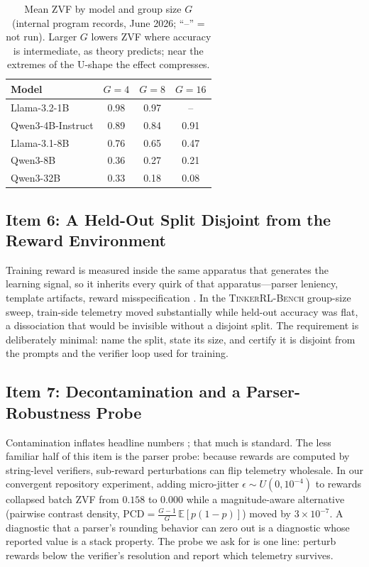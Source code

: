 \documentclass{article}  \usepackage[preprint,nonatbib]{neurips_2026} \usepackage[numbers]{natbib}
\newcommand{\ours}{\textsc{TinkerRL-Bench}}
\newcommand{\E}{\mathbb{E}}
\begin{document}
\begin{table}[t]
\centering
\caption{Mean ZVF by model and group size $G$ (internal program records,
June 2026; ``--'' = not run). Larger $G$ lowers ZVF where accuracy is
intermediate, as theory predicts; near the extremes of the U-shape the effect
compresses.}
\label{tab:p5-gsize}
\small
\begin{tabular}{@{}lccc@{}}
\toprule
Model & $G=4$ & $G=8$ & $G=16$ \\
\midrule
Llama-3.2-1B      & 0.98 & 0.97 & --   \\
Qwen3-4B-Instruct & 0.89 & 0.84 & 0.91 \\
Llama-3.1-8B      & 0.76 & 0.65 & 0.47 \\
Qwen3-8B          & 0.36 & 0.27 & 0.21 \\
Qwen3-32B         & 0.33 & 0.18 & 0.08 \\
\bottomrule
\end{tabular}
\end{table}

\subsection{Item 6: A Held-Out Split Disjoint from the Reward Environment}
\label{sec:p5-item6}
Training reward is measured inside the same apparatus that generates the
learning signal, so it inherits every quirk of that apparatus---parser
leniency, template artifacts, reward misspecification
\citep{gao2023reward, krakovna2020specification}. In the \ours{} group-size
sweep, train-side telemetry moved substantially while held-out accuracy was
flat, a dissociation that would be invisible without a disjoint split. The
requirement is deliberately minimal: name the split, state its size, and
certify it is disjoint from the prompts and the verifier loop used for
training.

\subsection{Item 7: Decontamination and a Parser-Robustness Probe}
\label{sec:p5-item7}
Contamination inflates headline numbers \citep{zhang2024gsm1k,
riddell2024contamination}; that much is standard. The less familiar half of
this item is the parser probe: because rewards are computed by string-level
verifiers, sub-reward perturbations can flip telemetry wholesale. In our
convergent repository experiment, adding micro-jitter
$\epsilon \sim U(0, 10^{-4})$ to rewards collapsed batch ZVF from $0.158$ to
$0.000$ while a magnitude-aware alternative (pairwise contrast density,
$\mathrm{PCD} = \frac{G-1}{G}\,\E[p(1-p)]$) moved by $3\times 10^{-7}$. A
diagnostic that a parser's rounding behavior can zero out is a diagnostic
whose reported value is a stack property. The probe we ask for is one line:
perturb rewards below the verifier's resolution and report which telemetry
survives.
\end{document}

